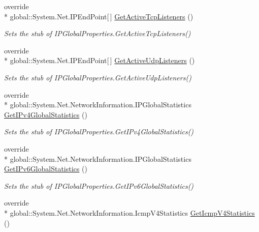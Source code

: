 \begin{DoxyCompactItemize}
override \\*
global\-::\-System.\-Net.\-I\-P\-End\-Point\mbox{[}$\,$\mbox{]} \hyperlink{class_system_1_1_net_1_1_network_information_1_1_fakes_1_1_stub_i_p_global_properties_af74197ffdd9d06c8011c6834db8b8322}{Get\-Active\-Tcp\-Listeners} ()
\begin{DoxyCompactList}\small\item\em Sets the stub of I\-P\-Global\-Properties.\-Get\-Active\-Tcp\-Listeners()\end{DoxyCompactList}\item 
override \\*
global\-::\-System.\-Net.\-I\-P\-End\-Point\mbox{[}$\,$\mbox{]} \hyperlink{class_system_1_1_net_1_1_network_information_1_1_fakes_1_1_stub_i_p_global_properties_aaf2415c378739f72db9a512f977c00fd}{Get\-Active\-Udp\-Listeners} ()
\begin{DoxyCompactList}\small\item\em Sets the stub of I\-P\-Global\-Properties.\-Get\-Active\-Udp\-Listeners()\end{DoxyCompactList}\item 
override \\*
global\-::\-System.\-Net.\-Network\-Information.\-I\-P\-Global\-Statistics \hyperlink{class_system_1_1_net_1_1_network_information_1_1_fakes_1_1_stub_i_p_global_properties_a294b9dcb91877f63511904006259d6d9}{Get\-I\-Pv4\-Global\-Statistics} ()
\begin{DoxyCompactList}\small\item\em Sets the stub of I\-P\-Global\-Properties.\-Get\-I\-Pv4\-Global\-Statistics()\end{DoxyCompactList}\item 
override \\*
global\-::\-System.\-Net.\-Network\-Information.\-I\-P\-Global\-Statistics \hyperlink{class_system_1_1_net_1_1_network_information_1_1_fakes_1_1_stub_i_p_global_properties_ad9de6998289bb5519eefdb0eaaea4c6b}{Get\-I\-Pv6\-Global\-Statistics} ()
\begin{DoxyCompactList}\small\item\em Sets the stub of I\-P\-Global\-Properties.\-Get\-I\-Pv6\-Global\-Statistics()\end{DoxyCompactList}\item 
override \\*
global\-::\-System.\-Net.\-Network\-Information.\-Icmp\-V4\-Statistics \hyperlink{class_system_1_1_net_1_1_network_information_1_1_fakes_1_1_stub_i_p_global_properties_abd709eca70fec921c2b92cb6757686e6}{Get\-Icmp\-V4\-Statistics} ()

\end{DoxyCompactItemize}
